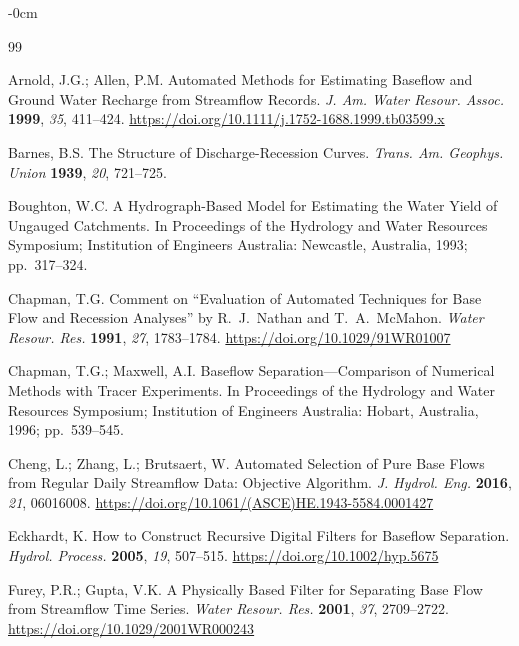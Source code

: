 \documentclass[hydrology,article,submit,pdftex,moreauthors]{Definitions/mdpi}
\begin{document}
\begin{adjustwidth}{-\extralength}{0cm}


\begin{thebibliography}{99}

Arnold, J.G.; Allen, P.M. Automated Methods for Estimating Baseflow and Ground Water Recharge from Streamflow Records. \textit{J. Am. Water Resour. Assoc.} \textbf{1999}, \textit{35}, 411--424. \url{https://doi.org/10.1111/j.1752-1688.1999.tb03599.x}

Barnes, B.S. The Structure of Discharge-Recession Curves. \textit{Trans. Am. Geophys. Union} \textbf{1939}, \textit{20}, 721--725.

Boughton, W.C. A Hydrograph-Based Model for Estimating the Water Yield of Ungauged Catchments. In Proceedings of the Hydrology and Water Resources Symposium; Institution of Engineers Australia: Newcastle, Australia, 1993; pp.~317--324.

Chapman, T.G. Comment on ``Evaluation of Automated Techniques for Base Flow and Recession Analyses'' by R.~J.~Nathan and T.~A.~McMahon. \textit{Water Resour. Res.} \textbf{1991}, \textit{27}, 1783--1784. \url{https://doi.org/10.1029/91WR01007}

Chapman, T.G.; Maxwell, A.I. Baseflow Separation---Comparison of Numerical Methods with Tracer Experiments. In Proceedings of the Hydrology and Water Resources Symposium; Institution of Engineers Australia: Hobart, Australia, 1996; pp.~539--545.

Cheng, L.; Zhang, L.; Brutsaert, W. Automated Selection of Pure Base Flows from Regular Daily Streamflow Data: Objective Algorithm. \textit{J. Hydrol. Eng.} \textbf{2016}, \textit{21}, 06016008. \url{https://doi.org/10.1061/(ASCE)HE.1943-5584.0001427}

Eckhardt, K. How to Construct Recursive Digital Filters for Baseflow Separation. \textit{Hydrol. Process.} \textbf{2005}, \textit{19}, 507--515. \url{https://doi.org/10.1002/hyp.5675}

Furey, P.R.; Gupta, V.K. A Physically Based Filter for Separating Base Flow from Streamflow Time Series. \textit{Water Resour. Res.} \textbf{2001}, \textit{37}, 2709--2722. \url{https://doi.org/10.1029/2001WR000243}


\end{thebibliography}
\end{adjustwidth}
\end{document}
